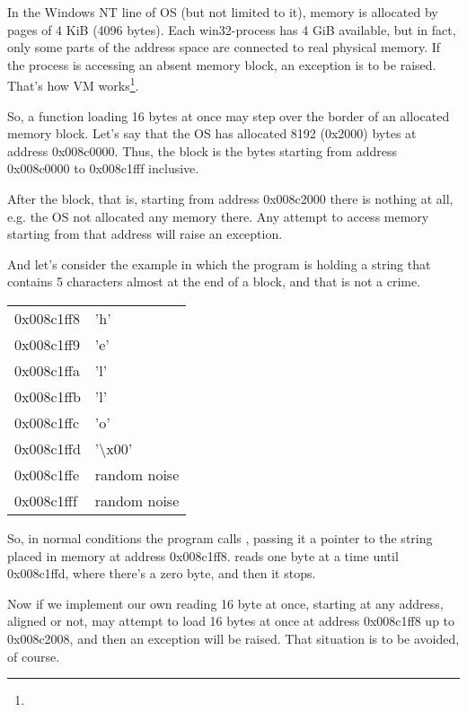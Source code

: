 In the \gls{Windows NT} line of \ac{OS} (but not limited to it), memory is allocated by pages of 4 KiB (4096 bytes).
Each win32-process has 4 GiB available, but in fact, only some parts
of the address space are connected to real physical memory.
If the process is accessing an absent memory block, an exception is to be raised.
That's how \ac{VM} works\footnote{\URLPAGE}.

So, a function loading 16 bytes at once  may step over the border of an allocated memory block.
Let's say that the \ac{OS} has allocated 8192 (0x2000) bytes at address 0x008c0000.
Thus, the block is the bytes starting from address 0x008c0000 to 0x008c1fff inclusive.

After the block, that is, starting from address 0x008c2000 there is nothing at all, e.g. the \ac{OS} not allocated
any memory there.
Any attempt to access memory starting from that address will raise an exception.

And let's consider the example in which the program is holding a string that contains 5 characters almost
at the end of a block, and that is not a crime.

\begin{center}
  \begin{tabular}{ | l | l | }
    \hline
        0x008c1ff8 & 'h' \\
        0x008c1ff9 & 'e' \\
        0x008c1ffa & 'l' \\
        0x008c1ffb & 'l' \\
        0x008c1ffc & 'o' \\
        0x008c1ffd & '\textbackslash{}x00' \\
        0x008c1ffe & random noise \\
        0x008c1fff & random noise \\
    \hline
  \end{tabular}
\end{center}

So, in normal conditions the program calls \strlen, passing it a pointer to the string  
placed in memory at address 0x008c1ff8.
\strlen reads one byte at a time until 0x008c1ffd, where there's a zero byte, and then it stops.

Now if we implement our own \strlen reading 16 byte at once, starting at any address, aligned or not,
\MOVDQU may attempt to load 16 bytes at once at address 0x008c1ff8 up to 0x008c2008, 
and then an exception will be raised.
That situation is to be avoided, of course.

